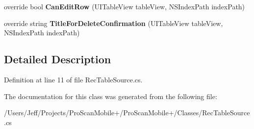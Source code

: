 \begin{DoxyCompactItemize}
\item 
\hypertarget{class_pro_scan_mobile_1_1_rec_table_source_a6878d721d17d3cc38f872308988dec7f}{override bool {\bfseries Can\-Edit\-Row} (U\-I\-Table\-View table\-View, N\-S\-Index\-Path index\-Path)}\label{class_pro_scan_mobile_1_1_rec_table_source_a6878d721d17d3cc38f872308988dec7f}

\item 
\hypertarget{class_pro_scan_mobile_1_1_rec_table_source_aab670ca701c9e2c1a9c0f352b1606dc2}{override string {\bfseries Title\-For\-Delete\-Confirmation} (U\-I\-Table\-View table\-View, N\-S\-Index\-Path index\-Path)}\label{class_pro_scan_mobile_1_1_rec_table_source_aab670ca701c9e2c1a9c0f352b1606dc2}

\end{DoxyCompactItemize}


\subsection{Detailed Description}


Definition at line 11 of file Rec\-Table\-Source.\-cs.



The documentation for this class was generated from the following file\-:\begin{DoxyCompactItemize}
\item 
/\-Users/\-Jeff/\-Projects/\-Pro\-Scan\-Mobile+/\-Pro\-Scan\-Mobile+/\-Classes/Rec\-Table\-Source.\-cs\end{DoxyCompactItemize}
